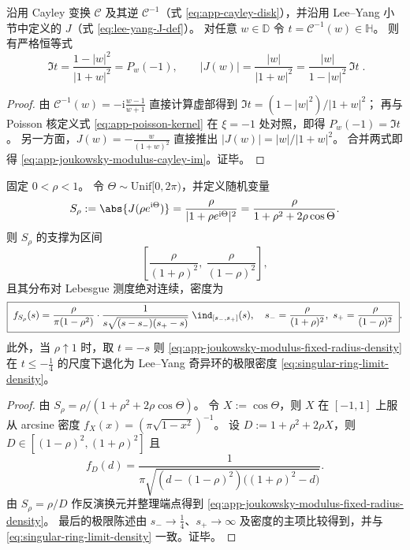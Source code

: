 \begin{lemma}\label{lem:app-endpoint-poisson-cayley-joukowsky}
沿用 Cayley 变换 \(\mathcal{C}\) 及其逆 \(\mathcal{C}^{-1}\)（式 \eqref{eq:app-cayley-disk}），并沿用 Lee--Yang 小节中定义的 \(J\)（式 \eqref{eq:lee-yang-J-def}）。
对任意 \(w\in\mathbb{D}\) 令 \(t=\mathcal{C}^{-1}(w)\in\mathbb{H}\)。
则有严格恒等式
\begin{equation}\label{eq:app-joukowsky-modulus-cayley-im}
\boxed{\;
\Im t=\frac{1-|w|^{2}}{|1+w|^{2}}=P_w(-1),
\qquad
|J(w)|=\frac{|w|}{|1+w|^{2}}=\frac{|w|}{1-|w|^{2}}\,\Im t\; }.
\end{equation}
\end{lemma}
\begin{proof}
由 \(\mathcal{C}^{-1}(w)=-\mathrm{i}\frac{w-1}{w+1}\) 直接计算虚部得到 \(\Im t=(1-|w|^2)/|1+w|^2\)；
再与 Poisson 核定义式 \eqref{eq:app-poisson-kernel} 在 \(\xi=-1\) 处对照，即得 \(P_w(-1)=\Im t\)。
另一方面，\(J(w)=-\frac{w}{(1+w)^2}\) 直接推出 \(|J(w)|=|w|/|1+w|^2\)。
合并两式即得 \eqref{eq:app-joukowsky-modulus-cayley-im}。证毕。
\end{proof}

\begin{proposition}\label{prop:app-joukowsky-modulus-fixed-radius-density}
固定 \(0<\rho<1\)。
令 \(\Theta\sim\mathrm{Unif}[0,2\pi)\)，并定义随机变量
\[
S_{\rho}:=\abs{J(\rho e^{\mathrm{i}\Theta})}
=\frac{\rho}{|1+\rho e^{\mathrm{i}\Theta}|^{2}}
=\frac{\rho}{1+\rho^{2}+2\rho\cos\Theta}.
\]
则 \(S_{\rho}\) 的支撑为区间
\[
\left[\frac{\rho}{(1+\rho)^2},\ \frac{\rho}{(1-\rho)^2}\right],
\]
且其分布对 Lebesgue 测度绝对连续，密度为
\begin{equation}\label{eq:app-joukowsky-modulus-fixed-radius-density}
\boxed{\;
f_{S_\rho}(s)
=\frac{\rho}{\pi(1-\rho^{2})}\cdot
\frac{1}{s\sqrt{(s-s_-)(s_+-s)}}
\;\ind_{[s_-,s_+]}(s),
\quad
s_-=\frac{\rho}{(1+\rho)^{2}},\ s_+=\frac{\rho}{(1-\rho)^{2}}\; }.
\end{equation}
此外，当 \(\rho\uparrow 1\) 时，取 \(t=-s\) 则 \eqref{eq:app-joukowsky-modulus-fixed-radius-density} 在 \(t\le -\tfrac14\) 的尺度下退化为 Lee--Yang 奇异环的极限密度 \eqref{eq:singular-ring-limit-density}。
\end{proposition}
\begin{proof}
由 \(S_\rho=\rho/(1+\rho^{2}+2\rho\cos\Theta)\)。
令 \(X:=\cos\Theta\)，则 \(X\) 在 \([-1,1]\) 上服从 arcsine 密度 \(f_X(x)=(\pi\sqrt{1-x^2})^{-1}\)。
设 \(D:=1+\rho^{2}+2\rho X\)，则 \(D\in[(1-\rho)^2,(1+\rho)^2]\) 且
\[
f_D(d)=\frac{1}{\pi\sqrt{(d-(1-\rho)^2)\bigl((1+\rho)^2-d\bigr)}}.
\]
由 \(S_\rho=\rho/D\) 作反演换元并整理端点得到 \eqref{eq:app-joukowsky-modulus-fixed-radius-density}。
最后的极限陈述由 \(s_-\to\tfrac14\)、\(s_+\to\infty\) 及密度的主项比较得到，并与 \eqref{eq:singular-ring-limit-density} 一致。证毕。
\end{proof}


